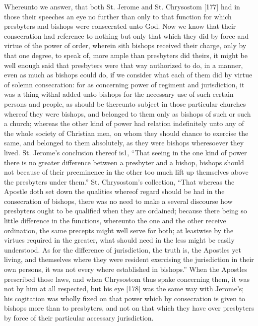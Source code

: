 Whereunto we answer, that both St. Jerome and St. Chrysostom [177] had in those their speeches an eye no further than only to that function for which presbyters and bishops were consecrated unto God. Now we know that their consecration had reference to nothing but only that which they did by force and virtue of the power of order, wherein sith bishops received their charge, only by that one degree, to speak of, more ample than presbyters did theirs, it might be well enough said that presbyters were that way authorized to do, in a manner, even as much as bishops could do, if we consider what each of them did by virtue of solemn consecration: for as concerning power of regiment and jurisdiction, it was a thing withal added unto bishops for the necessary use of such certain persons and people, as should be thereunto subject in those particular churches whereof they were bishops, and belonged to them only as bishops of such or such a church; whereas the other kind of power had relation indefinitely unto any of the whole society of Christian men, on whom they should chance to exercise the same, and belonged to them absolutely, as they were bishops wheresoever they lived. St. Jerome’s conclusion thereof is1, “That seeing in the one kind of power there is no greater difference between a presbyter and a bishop, bishops should not because of their preeminence in the other too much lift up themselves above the presbyters under them.” St. Chrysostom’s collection, “That whereas the Apostle doth set down the qualities whereof regard should be had in the consecration of bishops, there was no need to make a several discourse how presbyters ought to be qualified when they are ordained; because there being so little difference in the functions, whereunto the one and the other receive ordination, the same precepts might well serve for both; at leastwise by the virtues required in the greater, what should need in the less might be easily understood. As for the difference of jurisdiction, the truth is, the Apostles yet living, and themselves where they were resident exercising the jurisdiction in their own persons, it was not every where established in bishops.” When the Apostles prescribed those laws, and when Chrysostom thus spake concerning them, it was not by him at all respected, but his eye [178] was the same way with Jerome’s; his cogitation was wholly fixed on that power which by consecration is given to bishops more than to presbyters, and not on that which they have over presbyters by force of their particular accessary jurisdiction.

